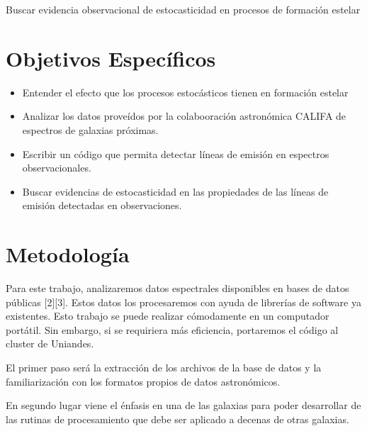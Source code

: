 \documentclass[12pt]{article}
\begin{document}
Buscar evidencia observacional de estocasticidad en procesos de
formaci\'on estelar

\section{Objetivos Espec\'ificos}


\begin{itemize}
	\item Entender el efecto que los procesos estoc\'asticos
          tienen en formaci\'on estelar
	\item Analizar los datos prove\'idos por la colabooraci\'on astron\'omica CALIFA de espectros
          de galaxias pr\'oximas.
	\item Escribir un c\'odigo que permita detectar l\'ineas de
          emisi\'on en espectros observacionales.
	\item Buscar evidencias de estocasticidad en las propiedades
          de las l\'ineas de emisi\'on detectadas en observaciones.
\end{itemize}

\section{Metodolog\'ia}


 
Para este trabajo, analizaremos datos espectrales disponibles en bases
de datos p\'ublicas [2][3]. Estos datos los procesaremos con ayuda de
librer\'ias de software ya existentes. Esto trabajo se puede realizar
c\'omodamente en un computador port\'atil. Sin embargo, si se
requiriera m\'as eficiencia, portaremos el c\'odigo al cluster de
Uniandes.

El primer paso ser\'a la extracci\'on de los archivos de la base de
datos y  la familiarizaci\'on con los formatos propios de datos
astron\'omicos. 

En segundo lugar viene el \'enfasis en una de las galaxias para poder
desarrollar de las rutinas de procesamiento que debe ser aplicado a
decenas de otras galaxias.
\end{document}
